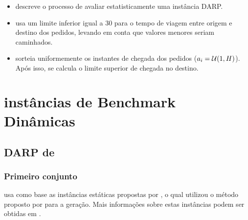\documentclass{anpet}
\begin{document}
\begin{itemize}
   \item \textcite{schilde_metaheuristics_2011} descreve o processo de avaliar estatisticamente uma instância DARP.
   
   \item \textcite{fujita_vehicle_2003} usa um limite inferior igual a 30 para o tempo de viagem entre origem e destino dos pedidos, levando em conta que valores menores seriam caminhados.
   
   \item \textcite{fujita_vehicle_2003} sorteia uniformemente os instantes de chegada dos pedidos ($a_{i} = \mathcal{U}(1,H)$). Após isso, se calcula o limite superior de chegada no destino.

\end{itemize}

\section{instâncias de Benchmark Dinâmicas}
\subsection{DARP de \textcite{berbeglia_hybrid_2012}}
\subsubsection{Primeiro conjunto \parencite{ropke_models_2007}}

\textcite{berbeglia_hybrid_2012} usa como base as instâncias estáticas propostas por \textcite{ropke_models_2007}, o qual utilizou o método proposto por \textcite{savelsbergh_drive:_1998} para a geração. Mais informações sobre estas instâncias podem ser obtidas em \textcite{cordeau_branch-and-cut_2006}.
\end{document}
